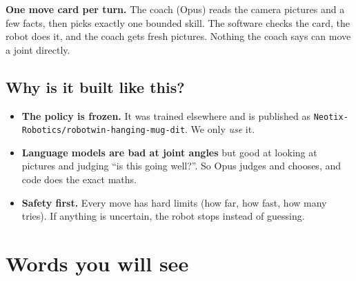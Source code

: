 \documentclass[11pt,a4paper]{article}
\begin{document}
\begin{keyidea}
\textbf{One move card per turn.} The coach (Opus) reads the camera pictures and a few facts, then
picks exactly one bounded skill. The software checks the card, the robot does it, and the coach
gets fresh pictures. Nothing the coach says can move a joint directly.
\end{keyidea}

\subsection*{Why is it built like this?}
\begin{itemize}
  \item \textbf{The policy is frozen.} It was trained elsewhere and is published as \nolinkurl{Neotix-Robotics/robotwin-hanging-mug-dit}. We only \emph{use} it.
  \item \textbf{Language models are bad at joint angles} but good at looking at pictures and judging ``is this going well?''. So Opus judges and chooses, and code does the exact maths.
  \item \textbf{Safety first.} Every move has hard limits (how far, how fast, how many tries). If anything is uncertain, the robot stops instead of guessing.
\end{itemize}

\section{Words you will see}
\end{document}
